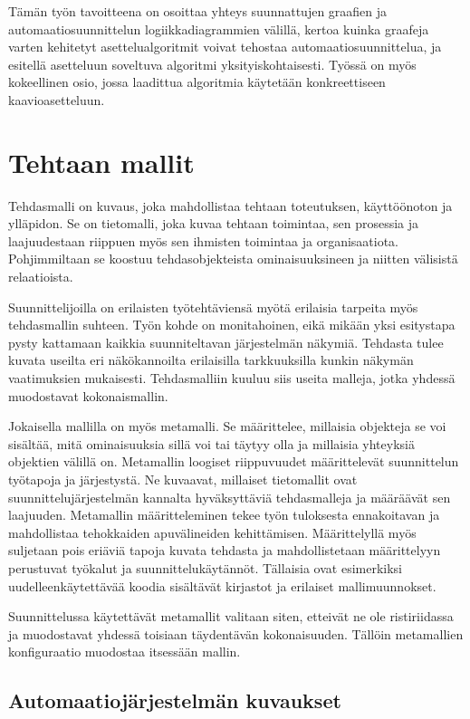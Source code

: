 \documentclass[finnish,12pt]{article}
\begin{document}
Tämän työn tavoitteena on osoittaa yhteys suunnattujen graafien ja automaatiosuunnittelun logiikkadiagrammien välillä, kertoa kuinka graafeja varten kehitetyt asettelualgoritmit voivat tehostaa automaatiosuunnittelua, ja esitellä asetteluun soveltuva algoritmi yksityiskohtaisesti.
Työssä on myös kokeellinen osio, jossa laadittua algoritmia käytetään konkreettiseen kaavioasetteluun.

	\clearpage
	\section{Tehtaan mallit}

Tehdasmalli on kuvaus, joka mahdollistaa tehtaan toteutuksen, käyttöönoton ja ylläpidon.
Se on tietomalli, joka kuvaa tehtaan toimintaa, sen prosessia ja laajuudestaan riippuen myös sen ihmisten toimintaa ja organisaatiota.
Pohjimmiltaan se koostuu tehdasobjekteista ominaisuuksineen ja niitten välisistä relaatioista. \cite{RefWorks:41}

Suunnittelijoilla on erilaisten työtehtäviensä myötä erilaisia tarpeita myös tehdasmallin suhteen.
Työn kohde on monitahoinen, eikä mikään yksi esitystapa pysty kattamaan kaikkia suunniteltavan järjestelmän näkymiä.
Tehdasta tulee kuvata useilta eri näkökannoilta erilaisilla tarkkuuksilla kunkin näkymän vaatimuksien mukaisesti.
Tehdasmalliin kuuluu siis useita malleja, jotka yhdessä muodostavat kokonaismallin.

Jokaisella mallilla on myös metamalli. Se määrittelee, millaisia objekteja se voi sisältää, mitä ominaisuuksia sillä voi tai täytyy olla ja millaisia yhteyksiä objektien välillä on.
Metamallin loogiset riippuvuudet määrittelevät suunnittelun työtapoja ja järjestystä.
Ne kuvaavat, millaiset tietomallit ovat suunnittelujärjestelmän kannalta hyväksyttäviä tehdasmalleja ja
määräävät sen laajuuden. Metamallin määritteleminen tekee työn tuloksesta ennakoitavan ja mahdollistaa tehokkaiden apuvälineiden kehittämisen.
Määrittelyllä myös suljetaan pois eriäviä tapoja kuvata tehdasta ja mahdollistetaan määrittelyyn perustuvat työkalut ja suunnittelukäytännöt.
Tällaisia ovat esimerkiksi uudelleenkäytettävää koodia sisältävät kirjastot ja erilaiset mallimuunnokset.

Suunnittelussa käytettävät metamallit valitaan siten, etteivät ne ole ristiriidassa ja muodostavat yhdessä toisiaan täydentävän kokonaisuuden.
Tällöin metamallien konfiguraatio muodostaa itsessään mallin.


	\subsection{Automaatiojärjestelmän kuvaukset}
\end{document}
